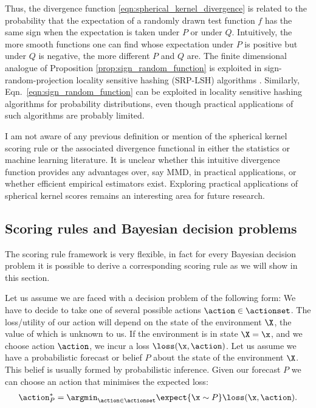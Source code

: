 Thus, the divergence function \eqref{eqn:spherical_kernel_divergence} is related to the probability that the expectation of a randomly drawn test function $f$ has the same sign when the expectation is taken under $P$ or under $Q$. Intuitively, the more smooth functions one can find whose expectation under $P$ is positive but under $Q$ is negative, the more different $P$ and $Q$ are. The finite dimensional analogue of Proposition \ref{prop:sign_random_function} is exploited in sign-random-projection locality sensitive hashing (SRP-LSH) algorithms \citep{Charikar2002,Ji2012}. Similarly, Eqn.\ \eqref{eqn:sign_random_function} can be exploited in locality sensitive hashing algorithms for probability distributions, even though practical applications of such algorithms are probably limited.

I am not aware of any previous definition or mention of the spherical kernel scoring rule or the associated divergence functional in either the statistics or machine learning literature. It is unclear whether this intuitive divergence function provides any advantages over, say MMD, in practical applications, or whether efficient empirical estimators exist. Exploring practical applications of spherical kernel scores remains an interesting area for future research.


\subsection{Scoring rules and Bayesian decision problems \label{sec:loss_scoring_rule}}

The scoring rule framework is very flexible, in fact for every Bayesian decision problem it is possible to derive a corresponding scoring rule as we will show in this section.

Let us assume we are faced with a decision problem of the following form: We have to decide to take one of several possible actions $\action\in\actionset$. The loss/utility of our action will depend on the state of the environment $\X$, the value of which is unknown to us. If the environment is in state $\X=\x$, and we choose action $\action$, we incur a loss $\loss(\x,\action)$.
Let us assume we have a probabilistic forecast or belief $P$ about the state of the environment $\X$. This belief is usually formed by probabilistic inference. Given our forecast $P$ we can choose an action that minimises the expected loss:
%
\begin{align}
	\action^{*}_{P} = \argmin_{\action\in\actionset} \expect{\x \sim P} \loss(\x,\action).
\end{align}

